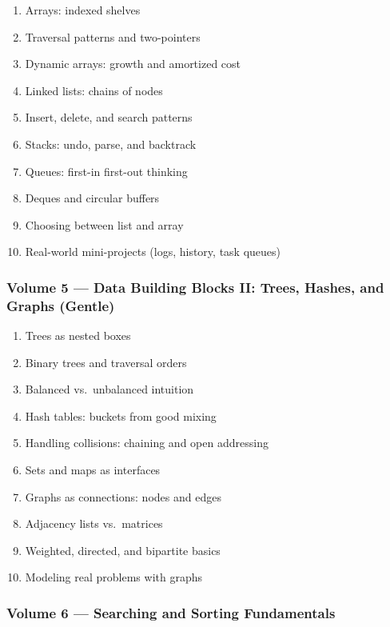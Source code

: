 \documentclass[
  letterpaper,
  DIV=11,
  numbers=noendperiod]{scrreprt}
\providecommand{\tightlist}{%
  \setlength{\itemsep}{0pt}\setlength{\parskip}{0pt}}
\begin{document}
\begin{enumerate}
\def\labelenumi{\arabic{enumi}.}
\setcounter{enumi}{30}
\tightlist
\item
  Arrays: indexed shelves
\item
  Traversal patterns and two-pointers
\item
  Dynamic arrays: growth and amortized cost
\item
  Linked lists: chains of nodes
\item
  Insert, delete, and search patterns
\item
  Stacks: undo, parse, and backtrack
\item
  Queues: first-in first-out thinking
\item
  Deques and circular buffers
\item
  Choosing between list and array
\item
  Real-world mini-projects (logs, history, task queues)
\end{enumerate}

\subsubsection{Volume 5 --- Data Building Blocks II: Trees, Hashes, and
Graphs
(Gentle)}\label{volume-5-data-building-blocks-ii-trees-hashes-and-graphs-gentle}

\begin{enumerate}
\def\labelenumi{\arabic{enumi}.}
\setcounter{enumi}{40}
\tightlist
\item
  Trees as nested boxes
\item
  Binary trees and traversal orders
\item
  Balanced vs.~unbalanced intuition
\item
  Hash tables: buckets from good mixing
\item
  Handling collisions: chaining and open addressing
\item
  Sets and maps as interfaces
\item
  Graphs as connections: nodes and edges
\item
  Adjacency lists vs.~matrices
\item
  Weighted, directed, and bipartite basics
\item
  Modeling real problems with graphs
\end{enumerate}

\subsubsection{Volume 6 --- Searching and Sorting
Fundamentals}\label{volume-6-searching-and-sorting-fundamentals}
\end{document}
